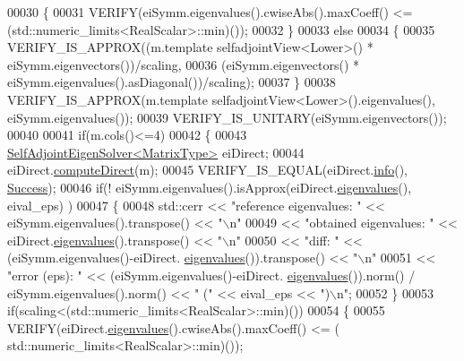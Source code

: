 \begin{DoxyCode}
00030   \{
00031     VERIFY(eiSymm.eigenvalues().cwiseAbs().maxCoeff() <= (std::numeric\_limits<RealScalar>::min)());
00032   \}
00033   \textcolor{keywordflow}{else}
00034   \{
00035     VERIFY\_IS\_APPROX((m.template selfadjointView<Lower>() * eiSymm.eigenvectors())/scaling,
00036                      (eiSymm.eigenvectors() * eiSymm.eigenvalues().asDiagonal())/scaling);
00037   \}
00038   VERIFY\_IS\_APPROX(m.template selfadjointView<Lower>().eigenvalues(), eiSymm.eigenvalues());
00039   VERIFY\_IS\_UNITARY(eiSymm.eigenvectors());
00040 
00041   \textcolor{keywordflow}{if}(m.cols()<=4)
00042   \{
00043     \hyperlink{group___eigenvalues___module_class_eigen_1_1_self_adjoint_eigen_solver}{SelfAdjointEigenSolver<MatrixType>} eiDirect;
00044     eiDirect.\hyperlink{group___eigenvalues___module_a40b0a68841d6176b1ab98743cc82bef4}{computeDirect}(m);  
00045     VERIFY\_IS\_EQUAL(eiDirect.\hyperlink{group___eigenvalues___module_a56bd59b85a6f6f00ff7bff307ad0e015}{info}(), \hyperlink{group__enums_gga85fad7b87587764e5cf6b513a9e0ee5ea52581b035f4b59c203b8ff999ef5fcea}{Success});
00046     \textcolor{keywordflow}{if}(! eiSymm.eigenvalues().isApprox(eiDirect.\hyperlink{group___eigenvalues___module_a8efab27e82aa6aa0ae0c64739238c2e0}{eigenvalues}(), eival\_eps) )
00047     \{
00048       std::cerr << \textcolor{stringliteral}{"reference eigenvalues: "} << eiSymm.eigenvalues().transpose() << \textcolor{stringliteral}{"\(\backslash\)n"}
00049                 << \textcolor{stringliteral}{"obtained eigenvalues:  "} << eiDirect.\hyperlink{group___eigenvalues___module_a8efab27e82aa6aa0ae0c64739238c2e0}{eigenvalues}().transpose() << \textcolor{stringliteral}{"\(\backslash\)n"}
00050                 << \textcolor{stringliteral}{"diff:                  "} << (eiSymm.eigenvalues()-eiDirect.
      \hyperlink{group___eigenvalues___module_a8efab27e82aa6aa0ae0c64739238c2e0}{eigenvalues}()).transpose() << \textcolor{stringliteral}{"\(\backslash\)n"}
00051                 << \textcolor{stringliteral}{"error (eps):           "} << (eiSymm.eigenvalues()-eiDirect.
      \hyperlink{group___eigenvalues___module_a8efab27e82aa6aa0ae0c64739238c2e0}{eigenvalues}()).norm() / eiSymm.eigenvalues().norm() << \textcolor{stringliteral}{"  ("} << eival\_eps << \textcolor{stringliteral}{")\(\backslash\)n"};
00052     \}
00053     \textcolor{keywordflow}{if}(scaling<(std::numeric\_limits<RealScalar>::min)())
00054     \{
00055       VERIFY(eiDirect.\hyperlink{group___eigenvalues___module_a8efab27e82aa6aa0ae0c64739238c2e0}{eigenvalues}().cwiseAbs().maxCoeff() <= (
      std::numeric\_limits<RealScalar>::min)());

\end{DoxyCode}
